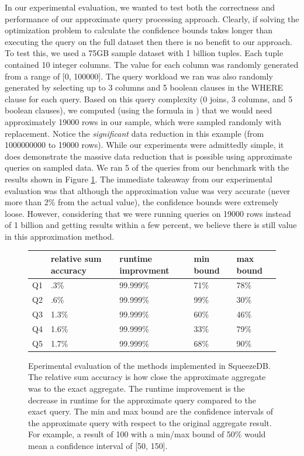 \documentclass[11pt]{article}
\begin{document}
In our experimental evaluation, we wanted to test both the correctness
and performance of our approximate query processing approach. Clearly,
if solving the optimization problem to calculate the confidence bounds
takes longer than executing the query on the full dataset then there
is no benefit to our approach. To test this, we used a 75GB sample
dataset with 1 billion tuples. Each tuple contained 10 integer
columns. The value for each column was randomly generated from a range
of [0, 100000]. The query workload we ran was also randomly generated
by selecting up to 3 columns and 5 boolean clauses in the WHERE clause
for each query. Based on this query complexity (0 joins, 3 columns,
and 5 boolean clauses), we computed (using the formula in
\cite{Matteo}) that we would need approximately 19000 rows in our
sample, which were sampled randomly with replacement. Notice the
\emph{significant} data reduction in this example (from 1000000000 to 19000
rows). While our experiments were admittedly simple, it does
demonstrate the massive data reduction that is possible using
approximate queries on sampled data. We ran 5 of the queries from our
benchmark with the results shown in Figure \ref{fig:results}. The
immediate takeaway from our experimental evaluation was that although
the approximation value was very accurate (never more than 2\% from
the actual value), the confidence bounds were extremely
loose. However, considering that we were running queries on 19000 rows
instead of 1 billion and getting results within a few percent, we
believe there is still value in this approximation method.

\begin{figure}
\centering
\begin{tabular} {| l | l | l | l | l |}
\hline
& relative sum accuracy & runtime improvment & min bound & max bound \\
\hline
Q1 & .3\% & 99.999\% & 71\% & 78\% \\
\hline
Q2 & .6\% &  99.999\% & 99\% & 30\% \\
\hline
Q3 & 1.3\% &  99.999\% & 60\% & 46\% \\
\hline
Q4 & 1.6\% &  99.999\% & 33\% & 79\% \\
\hline
Q5 & 1.7\% &  99.999\% & 68\% & 90\% \\
\hline
\end{tabular}
\caption{Eperimental evaluation of the methods implemented in
  SqueezeDB. The relative sum accuracy is how close the approximate
  aggregate was to the exact aggregate. The runtime improvement is the
decrease in runtime for the approximate query compared to the exact
query. The min and max bound are the confidence intervals of the
approximate query with respect to the original aggregate result. For
example, a result of 100 with a min/max bound of 50\% would mean a
confidence interval of [50, 150].}
\label{fig:results}
\end{figure}
\end{document}
